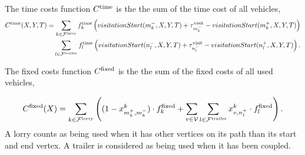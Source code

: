 The time costs function $C^{\rm time}$ is the the sum of the time cost of all vehicles,
\begin{align}
   C^{\rm time}(X,Y,T) =
   \sum_{k \in \mathcal F^{\rm lorry}} f^{\rm time}_k
   \left(
   visitationStart(m^-_k,X,Y,T) + \tau^{\rm visit}_{m^-_k} - visitationStart(m^+_k,X,Y,T)
   \right)  \notag \\
   \sum_{l \in \mathcal F^{\rm trailer}} f^{\rm time}_l
   \left(
   visitationStart(n^-_l,X,Y,T) + \tau^{\rm visit}_{n^-_l} - visitationStart(n^+_l,X,Y,T)
   \right) .
\end{align}


The fixed costs function $C^{\rm fixed}$ is the the sum of the fixed costs of all used vehicles,

\begin{align}
   C^{\rm fixed}(X) =
   \sum_{k \in \mathcal F^{\rm lorry}}
   \left(
   (1 - x^k_{m^+_k,m^-_k }) \cdot f^{\rm fixed}_k
   +
  \sum_{v \in \mathcal V  }
   \sum_{l \in \mathcal F^{\rm trailer}}
   x^k_{v,n^+_l} \cdot f^{\rm fixed}_l
   \right).
\end{align}
A lorry counts as being used when it has other vertices on its path than its start and end vertex.
A trailer is considered as being used when it has been coupled.


